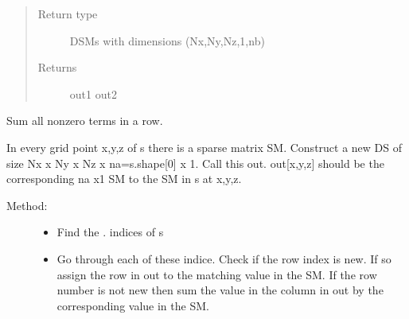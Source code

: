 \documentclass[letterpaper,10pt,english]{sphinxmanual}
\begin{document}
\begin{fulllineitems}
\begin{fulllineitems}
\begin{itemize}
\begin{itemize}
\end{itemize}

\end{itemize}
\begin{quote}\begin{description}
\item[{Return type}]  DSMs with dimensions (Nx,Ny,Nz,1,nb)

\item[{Returns}] \leavevmode
out1 out2

\end{description}\end{quote}

\end{fulllineitems}


\begin{fulllineitems}
\label{\detokenize{index:DictionarySparseMatrix.DS.row_sum}}
Sum all nonzero terms in a row.

In every grid point x,y,z of s there is a sparse matrix SM.
Construct a new DS of size Nx x Ny x Nz x na=s.shape{[}0{]} x 1.
Call this out.
out{[}x,y,z{]} should be the corresponding na x1 SM to the SM in s at x,y,z.
\begin{description}
\item[{Method:}] \leavevmode\begin{itemize}
\item {} 
Find the {\hyperref[\detokenize{index:DictionarySparseMatrix.DS}]{}}. {\hyperref[\detokenize{index:DictionarySparseMatrix.DS.nonzero}]{}} indices of s\textasciigrave{}

\item {} 
Go through each of these indice. Check if the       row index is new. If so assign the row in out to the matching       value in the SM. If the row number is not new then sum the       value in the column in out by the corresponding value in the SM.

\end{itemize}

\end{description}


\end{fulllineitems}
\end{fulllineitems}
\end{document}
